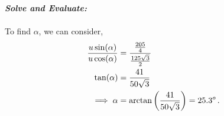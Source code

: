 \begin{subquestions}
\begin{subsubquestions}

\subsubquestion

\textbf{\textit{Solve and Evaluate:}} \\ \\
To find $\alpha$, we can consider,
\begin{align}
	\frac{u\sin(\alpha)}{u\cos(\alpha)} & = \frac{\frac{205}{4}}{\frac{125\sqrt{3}}{2}} \nonumber \\
	\tan(\alpha) & = \frac{41}{50\sqrt{3}} \nonumber \\
	\implies \alpha & = \arctan\left(\frac{41}{50\sqrt{3}}\right) = 25.3^o \,.
\end{align}
	
\end{subsubquestions}

\end{subquestions}
	